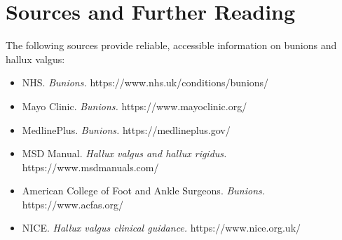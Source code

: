 \section*{Sources and Further Reading}
The following sources provide reliable, accessible information on bunions and hallux valgus:
\begin{itemize}
    \item NHS. \textit{Bunions.} https://www.nhs.uk/conditions/bunions/
    \item Mayo Clinic. \textit{Bunions.} https://www.mayoclinic.org/
    \item MedlinePlus. \textit{Bunions.} https://medlineplus.gov/
    \item MSD Manual. \textit{Hallux valgus and hallux rigidus.} https://www.msdmanuals.com/
    \item American College of Foot and Ankle Surgeons. \textit{Bunions.} https://www.acfas.org/
    \item NICE. \textit{Hallux valgus clinical guidance.} https://www.nice.org.uk/
\end{itemize}
